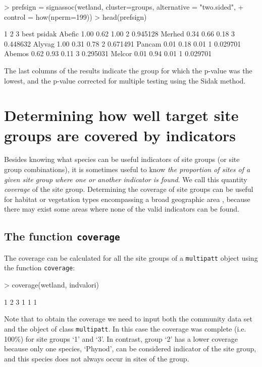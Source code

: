 \documentclass[11pt,a4paper]{article}
\begin{document}
\begin{Schunk}
\begin{Sinput}
> prefsign = signassoc(wetland, cluster=groups,  alternative = "two.sided", 
+                      control = how(nperm=199)) 
> head(prefsign)
\end{Sinput}
\begin{Soutput}
          1    2    3 best   psidak
Abefic 1.00 0.62 1.00    2 0.945128
Merhed 0.34 0.66 0.18    3 0.448632
Alyvag 1.00 0.31 0.78    2 0.671491
Pancam 0.01 0.18 0.01    1 0.029701
Abemos 0.62 0.93 0.11    3 0.295031
Melcor 0.01 0.94 0.01    1 0.029701
\end{Soutput}
\end{Schunk}
The last columns of the results indicate the group for which the p-value was the lowest, and the p-value corrected for multiple testing using the Sidak method.

\section{Determining how well target site groups are covered by indicators}
Besides knowing what species can be useful indicators of site groups (or site group combinations), it is sometimes useful to know \emph{the proportion of sites of a given site group where one or another indicator is found}. We call this quantity \emph{coverage} of the site group. Determining the coverage of site groups can be useful for habitat or vegetation types encompassing a broad geographic area \citep{DeCaceres2012}, because there may exist some areas where none of the valid indicators can be found.  
\subsection{The function \texttt{coverage}}
The coverage can be calculated for all the site groups of a \texttt{multipatt} object using the function \texttt{coverage}:
\begin{Schunk}
\begin{Sinput}
> coverage(wetland, indvalori)
\end{Sinput}
\begin{Soutput}
1 2 3 
1 1 1 
\end{Soutput}
\end{Schunk}
Note that to obtain the coverage we need to input both the community data set and the object of class \texttt{multipatt}. In this case the coverage was complete (i.e. 100\%) for site groups `1' and `3'. In contrast, group `2' has a lower coverage because only one species, `Phynod', can be considered indicator of the site group, and this species does not always occur in sites of the group. 
\end{document}
